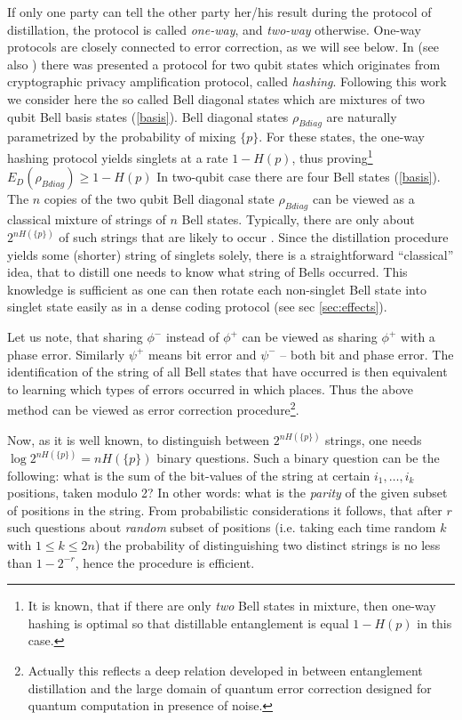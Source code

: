 \documentclass[rmp,12pt,preprint]{revtex4-2}
\begin{document}
If only one party can tell the other party her/his result during the
protocol of distillation, the protocol is called {\it one-way}, and
{\it two-way} otherwise. One-way protocols are closely connected to
error correction, as we will see below. In \cite{BDSW1996} (see also
\cite{BBPSSW1996}) there was presented a protocol for two qubit states
which originates from cryptographic privacy amplification protocol,
called {\it hashing}. Following this work we consider here the so
called Bell diagonal states which are mixtures of two qubit Bell basis
states (\ref{basis}).  Bell diagonal states $\rho_{Bdiag}$ are
naturally parametrized by the probability of mixing $\{p\}$.  For
these states, the one-way hashing protocol yields singlets at a rate
$1-H(p)$, thus proving\footnote{It is known, that if there are only
  {\it two} Bell states in mixture, then one-way hashing is optimal so
  that distillable entanglement is equal $1-H(p)$ in this case.}
$E_D(\rho_{Bdiag})\geq 1-H(p)$ In two-qubit case there are four Bell
states (\ref{basis}). The $n$ copies of the two qubit Bell diagonal
state $\rho_{Bdiag}$ can be viewed as a classical mixture of strings
of $n$ Bell states.  Typically, there are only about $2^{nH(\{p\})}$
of such strings that are likely to occur \cite{CoverThomas}. Since the
distillation procedure yields some (shorter) string of singlets
solely, there is a straightforward ``classical'' idea, that to distill
one needs to know what string of Bells occurred. This knowledge is
sufficient as one can then rotate each non-singlet Bell state into
singlet state easily as in a dense coding protocol (see sec
\ref{sec:effects}).

Let us note, that sharing $\phi^-$ instead of  $\phi^+$
can be viewed as sharing $\phi^+$ with a phase error. Similarly $\psi^+$ means bit error and $\psi^-$
--  both bit and phase error.
 The identification of
the string of all Bell states that have occurred is then equivalent to
learning which types of errors occurred in which places. Thus the
above method can be viewed as error correction
procedure\footnote{Actually this reflects a deep relation developed in
  \cite{BDSW1996} between entanglement distillation and the large
  domain of quantum error correction designed for quantum computation
  in presence of noise.}.

Now, as it is well known, to distinguish between $2^{nH(\{p\})}$
strings, one needs $\log 2^{nH(\{p\})} = nH(\{p\})$ binary
questions. Such a binary question can be the following: what is the
sum of the bit-values of the string at certain $i_1,\ldots,i_k$
positions, taken modulo 2? In other words: what is the {\it parity} of
the given subset of positions in the string. From probabilistic
considerations it follows, that after $r$ such questions about {\it
  random} subset of positions (i.e.  taking each time random $k$ with
$1\leq k\leq 2n$) the probability of distinguishing two distinct
strings is no less than $1-2^{-r}$, hence the procedure is efficient.
\end{document}
